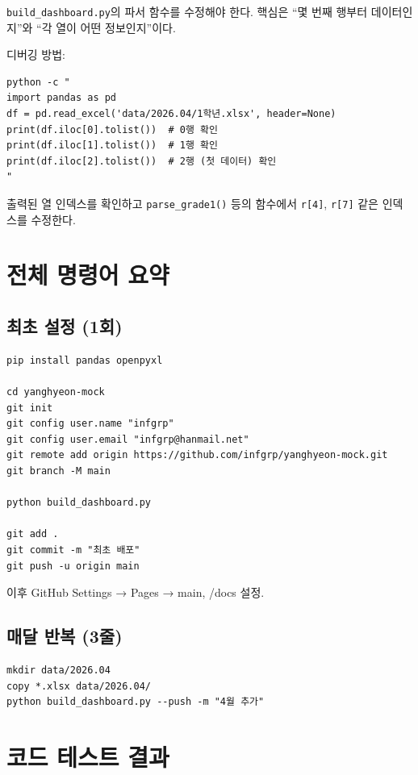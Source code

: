 \documentclass[11pt,a4paper]{article}
\begin{document}
\texttt{build\_dashboard.py}의 파서 함수를 수정해야 한다. 핵심은 ``몇 번째 행부터 데이터인지''와 ``각 열이 어떤 정보인지''이다.

디버깅 방법:

\begin{lstlisting}
python -c "
import pandas as pd
df = pd.read_excel('data/2026.04/1학년.xlsx', header=None)
print(df.iloc[0].tolist())  # 0행 확인
print(df.iloc[1].tolist())  # 1행 확인
print(df.iloc[2].tolist())  # 2행 (첫 데이터) 확인
"
\end{lstlisting}

출력된 열 인덱스를 확인하고 \texttt{parse\_grade1()} 등의 함수에서 \texttt{r[4]}, \texttt{r[7]} 같은 인덱스를 수정한다.


\section{전체 명령어 요약}

\subsection{최초 설정 (1회)}

\begin{lstlisting}
pip install pandas openpyxl

cd yanghyeon-mock
git init
git config user.name "infgrp"
git config user.email "infgrp@hanmail.net"
git remote add origin https://github.com/infgrp/yanghyeon-mock.git
git branch -M main

python build_dashboard.py

git add .
git commit -m "최초 배포"
git push -u origin main
\end{lstlisting}

이후 GitHub Settings → Pages → main, /docs 설정.

\subsection{매달 반복 (3줄)}

\begin{lstlisting}
mkdir data/2026.04
copy *.xlsx data/2026.04/
python build_dashboard.py --push -m "4월 추가"
\end{lstlisting}


\section{코드 테스트 결과}
\end{document}
